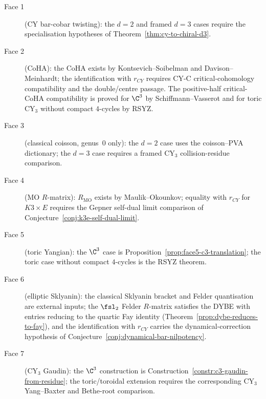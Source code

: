 \begin{remark}
\begin{description}
\item[Face 1] (CY bar-cobar twisting): the \(d=2\) and framed \(d=3\)
cases require the specialisation hypotheses of
Theorem~\ref{thm:cy-to-chiral-d3}.
\item[Face 2] (CoHA): the CoHA exists by
Kontsevich--Soibelman and Davison--Meinhardt; the identification with
\(r_{CY}\) requires CY-C critical-cohomology compatibility and the
double/centre passage. The positive-half critical-CoHA compatibility is
proved for \(\C^3\) by Schiffmann--Vasserot and for toric CY$_3$
without compact \(4\)-cycles by RSYZ.
\item[Face 3] (classical coisson, genus~$0$ only): the \(d=2\) case
uses the coisson--PVA dictionary; the \(d=3\) case requires a framed
CY$_3$ collision-residue comparison.
\item[Face 4] (MO $R$-matrix): \(R_{\mathrm{MO}}\) exists by
Maulik--Okounkov; equality with \(r_{CY}\) for \(K3 \times E\) requires
the Gepner self-dual limit comparison of
Conjecture~\ref{conj:k3e-self-dual-limit}.
\item[Face 5] (toric Yangian): the \(\C^3\) case is
Proposition~\ref{prop:face5-c3-translation}; the toric case without
compact \(4\)-cycles is the RSYZ theorem.
\item[Face 6] (elliptic Sklyanin): the classical Sklyanin bracket and
Felder quantisation are external inputs; the \(\fsl_2\) Felder
$R$-matrix satisfies the DYBE with entries reducing to the quartic
Fay identity (Theorem~\ref{prop:dybe-reduces-to-fay}), and the
identification with \(r_{CY}\) carries the dynamical-correction
hypothesis of Conjecture~\ref{conj:dynamical-bar-nilpotency}.
\item[Face 7] (CY$_3$ Gaudin): the \(\C^3\) construction is
Construction~\ref{constr:c3-gaudin-from-residue}; the toric/toroidal
extension requires the corresponding CY$_3$ Yang--Baxter and Bethe-root
comparison.
\end{description}
\end{remark}

